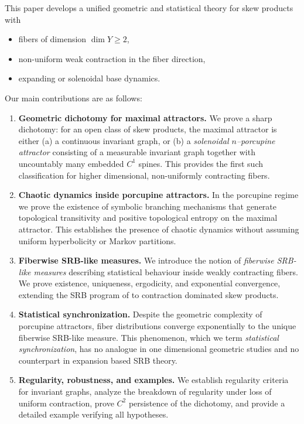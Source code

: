 \documentclass[11pt,reqno]{amsart}
\theoremstyle{plain}
\newtheorem*{theorem A}{Theorem A}
\newtheorem*{theorem B}{Theorem B}
\newtheorem*{theorem C}{Theorem C}
\newtheorem*{theorem 1}{Theorem 1}
\newtheorem*{theorem 2}{Theorem 2}
\newtheorem*{theorem 3}{Theorem 3}
\numberwithin{equation}{section}
\begin{document}
This paper develops a unified geometric and statistical theory for skew products with
\begin{itemize}
\item fibers of dimension $\dim Y\ge2$,
\item non-uniform weak contraction in the fiber direction,
\item expanding or solenoidal base dynamics.
\end{itemize}

Our main contributions are as follows:

\begin{enumerate}[label=(\roman*)]

\item \textbf{Geometric dichotomy for maximal attractors.}
We prove a sharp dichotomy: for an open class of skew products, the maximal attractor is either
(a) a continuous invariant graph, or
(b) a \emph{solenoidal $n$--porcupine attractor} consisting of a measurable invariant graph
together with uncountably many embedded $C^1$ spines.
This provides the first such classification for higher dimensional, non-uniformly contracting
fibers.

\item \textbf{Chaotic dynamics inside porcupine attractors.}
In the porcupine regime we prove the existence of symbolic branching mechanisms that generate
topological transitivity and positive topological entropy on the maximal attractor.
This establishes the presence of chaotic dynamics without assuming uniform hyperbolicity or
Markov partitions.

\item \textbf{Fiberwise SRB-like measures.}
We introduce the notion of \emph{fiberwise SRB-like measures} describing statistical behaviour
inside weakly contracting fibers.
We prove existence, uniqueness, ergodicity, and exponential convergence, extending the SRB
program of \cite{alves2000srb} to contraction dominated skew products.

\item \textbf{Statistical synchronization.}
Despite the geometric complexity of porcupine attractors, fiber distributions converge
exponentially to the unique fiberwise SRB-like measure.
This phenomenon, which we term \emph{statistical synchronization}, has no analogue in
one dimensional geometric studies and no counterpart in expansion based SRB theory.

\item \textbf{Regularity, robustness, and examples.}
We establish regularity criteria for invariant graphs, analyze the breakdown of regularity
under loss of uniform contraction, prove $C^2$ persistence of the dichotomy, and provide a
detailed example verifying all hypotheses.
\end{enumerate}
\end{document}
